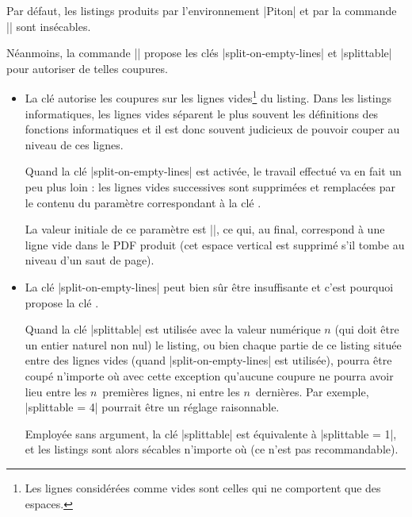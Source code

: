\documentclass[dvipsnames,svgnames]{article}
\begin{document}

Par défaut, les listings produits par l'environnement |{Piton}| et par la commande |\PitonInputFile| sont
insécables.


Néanmoins, la commande |\PitonOptions| propose les clés |split-on-empty-lines| et |splittable| pour autoriser de
telles coupures. 

\begin{itemize}
\item La clé  autorise les coupures sur les lignes vides\footnote{Les lignes considérées
  comme vides sont celles qui ne comportent que des espaces.} du listing. Dans les listings informatiques, les
lignes vides séparent le plus souvent les définitions des fonctions informatiques et il est donc souvent judicieux
de pouvoir couper au niveau de ces lignes.

Quand la clé |split-on-empty-lines| est activée, le travail effectué va en fait un peu plus loin : les lignes vides
successives sont supprimées et remplacées par le contenu du paramètre correspondant à la clé
. 

La valeur initiale de ce paramètre est |\vspace{\baselineskip}\vspace{-1.25pt}|, ce qui, au final, correspond à une
ligne vide dans le PDF produit (cet espace vertical est supprimé s'il tombe au niveau d'un saut de page).

\medskip
\item La clé |split-on-empty-lines| peut bien sûr être insuffisante et c'est pourquoi  propose la clé
. 

Quand la clé |splittable| est utilisée avec la valeur numérique $n$ (qui doit être un entier naturel non nul) le
listing, ou bien chaque partie de ce listing située entre des lignes vides (quand |split-on-empty-lines| est
utilisée), pourra être coupé n'importe où avec cette exception qu'aucune coupure ne pourra avoir lieu entre les
$n$~premières lignes, ni entre les $n$~dernières. Par exemple, |splittable = 4| pourrait être un réglage raisonnable.

Employée sans argument, la clé |splittable| est équivalente à |splittable = 1|, et les listings sont alors sécables
n'importe où (ce n'est pas recommandable). 

\end{itemize}
\end{document}
